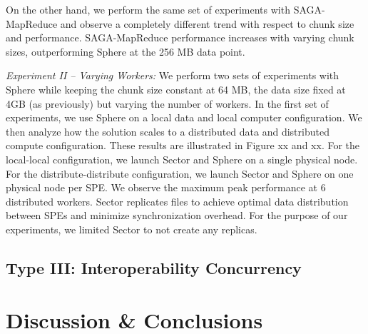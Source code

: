 \documentclass[3p,twocolumn]{elsarticle}
\begin{document}
On the other hand, we perform the same set of experiments with
SAGA-MapReduce and observe a completely different trend with respect
to chunk size and performance. SAGA-MapReduce performance increases
with varying chunk sizes, outperforming Sphere at the 256 MB data
point.   

{\it Experiment II -- Varying Workers:} We perform two sets of
experiments with Sphere  while keeping the chunk size constant at 64 MB, the
data size fixed at 4GB (as previously) but varying the number of
workers. In the first set of experiments, we use Sphere on a local
data and local computer configuration. We then analyze how the
solution scales to a distributed data and distributed compute
configuration. These results are illustrated in Figure xx and xx.  For
the local-local configuration, we launch Sector and Sphere on a single
physical node. For the distribute-distribute configuration, we launch
Sector and Sphere on one physical node per SPE.  We observe the
maximum peak performance at 6 distributed workers. Sector replicates
files to achieve optimal data distribution between SPEs and minimize
synchronization overhead. For the purpose of our experiments, we
limited Sector to not create any replicas.

\subsection{Type  III: Interoperability Concurrency}


\section{Discussion \& Conclusions}



\end{document}
